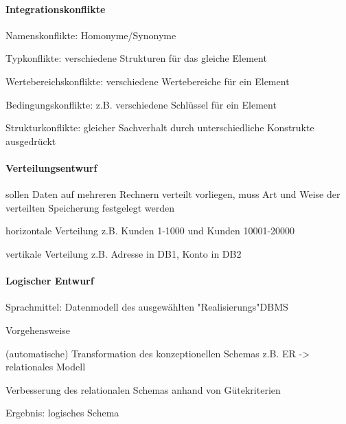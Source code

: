 \documentclass[a4paper]{article}
\begin{document}
\begin{multicols}{3}
\paragraph{Integrationskonflikte}
\begin{itemize*}
    \item Namenskonflikte: Homonyme/Synonyme
    \item Typkonflikte: verschiedene Strukturen für das gleiche Element
    \item Wertebereichskonflikte: verschiedene Wertebereiche für ein Element
    \item Bedingungskonflikte: z.B. verschiedene Schlüssel für ein Element
    \item Strukturkonflikte: gleicher Sachverhalt durch unterschiedliche Konstrukte ausgedrückt
\end{itemize*}

\paragraph{Verteilungsentwurf}
\begin{itemize*}
    \item sollen Daten auf mehreren Rechnern verteilt vorliegen, muss Art und Weise der verteilten Speicherung festgelegt werden
    \item horizontale Verteilung z.B. Kunden 1-1000 und Kunden 10001-20000
    \item vertikale Verteilung z.B. Adresse in DB1, Konto in DB2
\end{itemize*}

\paragraph{Logischer Entwurf}
\begin{itemize*}
    \item Sprachmittel: Datenmodell des ausgewählten "Realisierungs"DBMS
    \item Vorgehensweise
    \begin{enumerate*}
        \item (automatische) Transformation des konzeptionellen Schemas z.B. ER -> relationales Modell
        \item Verbesserung des relationalen Schemas anhand von Gütekriterien
    \end{enumerate*}
    \item Ergebnis: logisches Schema
\end{itemize*}


\end{multicols}
\end{document}
